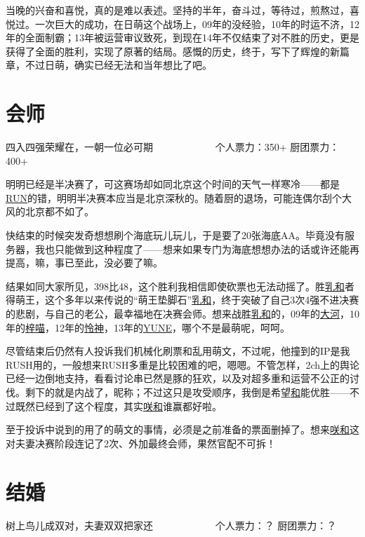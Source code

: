 当晚的兴奋和喜悦，真的是难以表述。坚持的半年，奋斗过，等待过，煎熬过，喜悦过。一次巨大的成功，在日萌这个战场上，09年的没经验，10年的时运不济，12年的全面制霸；13年被运营审议致死，到现在14年不仅结束了对不胜的历史，更是获得了全面的胜利，实现了原著的结局。感慨的历史，终于，写下了辉煌的新篇章，不过日萌，确实已经无法和当年想比了吧。

\chapter{会师}
\begin{center}
{\subTitle 四入四强荣耀在，一朝一位必可期}
\subMemo
　　　　　　个人票力：350+ 厨团票力：400+
\end{center}

明明已经是半决赛了，可这赛场却如同北京这个时间的天气一样寒冷——都是\uline{RUN}的错，明明半决赛本应当是北京深秋的。随着厨的退场，可能连偶尔刮个大风的北京都不如了。

快结束的时候突发奇想想刷个海底玩儿玩儿，于是要了20张海底AA。毕竟没有服务器，我也只能做到这种程度了——想来如果专门为海底想想办法的话或许还能再提高，嘛，事已至此，没必要了嘛。

结果如同大家所见，398比48，这个胜利我相信即使砍票也无法动摇了。胜\uline{乳和}者得萌王，这个多年以来传说的“萌王垫脚石”\uline{乳和}，终于突破了自己3次4强不进决赛的悲剧，与自己的老公，最幸福地在决赛会师。想来战胜\uline{乳和}的，09年的\uline{大河}，10年的\uline{梓喵}，12年的\uline{怜神}，13年的\uline{YUNE}，哪个不是最萌呢，呵呵。

尽管结束后仍然有人投诉我们机械化刷票和乱用萌文，不过呢，他撞到的IP是我RUSH用的，一般想来RUSH多重是比较困难的吧，嗯嗯。不管怎样，2ch上的舆论已经一边倒地支持，看看讨论串已然是豚的狂欢，以及对超多重和运营不公正的讨伐。剩下的就是内战了，昵称；不过这只是攻受顺序，我倒是希望\uline{和}能优胜——不过既然已经到了这个程度，其实\uline{咲}\uline{和}谁赢都好啦。

至于投诉中说到的用了的萌文的事情，必须是之前准备的票面删掉了。想来\uline{咲}\uline{和}这对夫妻决赛阶段连记了2次、外加最终会师，果然官配不可拆！

\chapter{结婚}
\begin{center}
{\subTitle 树上鸟儿成双对，夫妻双双把家还}
\subMemo
　　　　　　个人票力：？ 厨团票力：？
\end{center}


